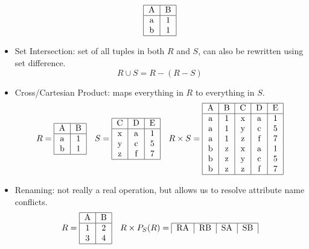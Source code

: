 \documentclass{math}
\begin{document}
\begin{itemize}
\[\begin{tabular}{|c|c|}
      \hline
      A & B \\
      \hline
      a & 1 \\
      b & 1 \\
      \hline
    \end{tabular} \]
  \item Set Intersection: set of all tuples in both \( R \) and \( S \), can
    also be rewritten using set difference.
    \[ R\cup S = R-(R-S) \]
  \item Cross/Cartesian Product: maps everything in \( R \) to everything in
    \( S \).
    \[ R = \begin{tabular}{|c|c|}
      \hline
      A & B \\
      \hline
      a & 1 \\
      b & 1 \\
      \hline
    \end{tabular} \quad
    S = \begin{tabular}{|c|c|c|}
      \hline
      C & D & E \\
      \hline
      x & a & 1 \\
      y & c & 5 \\
      z & f & 7 \\
      \hline
    \end{tabular} \quad
    R\times S = \begin{tabular}{|c|c|c|c|c|}
      \hline
      A & B & C & D & E \\
      \hline
      a & 1 & x & a & 1 \\
      a & 1 & y & c & 5 \\
      a & 1 & z & f & 7 \\
      b & z & x & a & 1 \\
      b & z & y & c & 5 \\
      b & z & z & f & 7 \\
      \hline
    \end{tabular} \]
  \item Renaming: not really a real operation, but allows us to resolve
    attribute name conflicts.
    \[ R = \begin{tabular}{|c|c|}
      \hline
      A & B \\
      \hline
      1 & 2 \\
      3 & 4 \\
      \hline
    \end{tabular} \quad
    R\times P_S(R) = \begin{tabular}{|c|c|c|c|}
      \hline
      RA & RB & SA & SB \\

\end{tabular}\]
\end{itemize}
\end{document}
